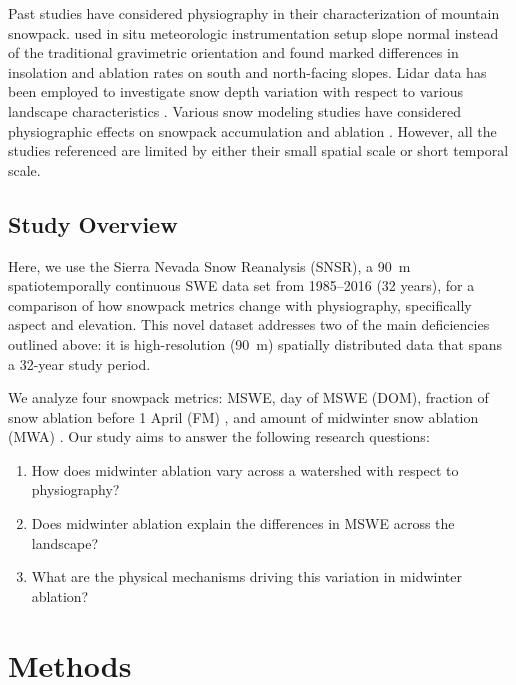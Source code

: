 Past studies have considered physiography in their characterization of mountain snowpack. \cite{pomeroyVariationSurfaceEnergetics2003} used in situ meteorologic instrumentation setup slope normal instead of the traditional gravimetric orientation and found marked differences in insolation and ablation rates on south and north-facing slopes. Lidar data has been employed to investigate snow depth variation with respect to various landscape characteristics \citep{kirchnerLiDARMeasurementSeasonal2014, tennantRegionalSensitivitiesSeasonal2017}. Various snow modeling studies have considered physiographic effects on snowpack accumulation and ablation \citep{broxtonForestCoverTopography2020,mazzottiCanopyStructureTopography2023, lopez-morenoEffectSlopeAspect2014}. However, all the studies referenced are limited by either their small spatial scale or short temporal scale.

\subsection{Study Overview}
Here, we use the Sierra Nevada Snow Reanalysis (SNSR), a 90~m spatiotemporally continuous SWE data set from 1985--2016 (32 years), for a comparison of how snowpack metrics change with physiography, specifically aspect and elevation. This novel dataset addresses two of the main deficiencies outlined above: it is high-resolution (90~m) spatially distributed data that spans a 32-year study period. 

We analyze four snowpack metrics: MSWE, day of MSWE (DOM), fraction of snow ablation before 1 April (FM) \citep{musselmanWinterMeltTrends2021}, and amount of midwinter snow ablation (MWA) \citep{harpoldHumidityDeterminesSnowpack2018}. Our study aims to answer the following research questions:

\begin{enumerate}
    \item How does midwinter ablation vary across a watershed with respect to physiography?

    \item Does midwinter ablation explain the differences in MSWE across the landscape?
    
    \item What are the physical mechanisms driving this variation in midwinter ablation?
\end{enumerate}



\hypertarget{ch2-sa}{\section{Methods}\label{ch2-sa}}


